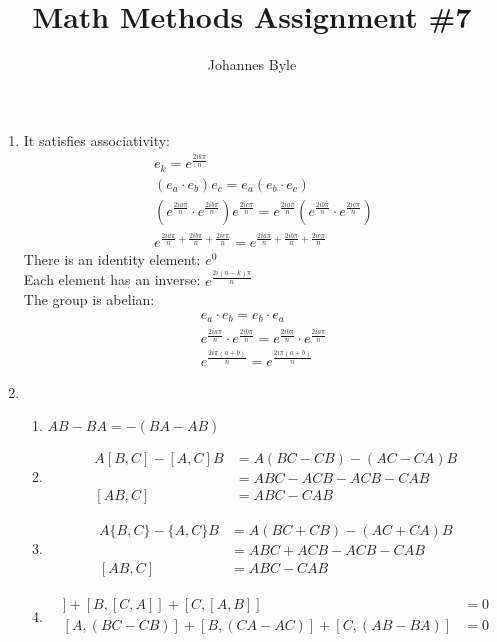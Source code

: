 \documentclass[11pt]{article}
\title{Math Methods Assignment \#7}
\author{Johannes Byle}
\begin{document}
  \maketitle
  \begin{enumerate}
    \item
    It satisfies associativity:
    \begin{gather*}
      e_k=e^{\frac{2ik\pi}{n}}\\
      (e_a\cdot e_b)e_c=e_a(e_b\cdot e_c)\\
      (e^{\frac{2ia\pi}{n}}\cdot e^{\frac{2ib\pi}{n}})e^{\frac{2ic\pi}{n}}=e^{\frac{2ia\pi}{n}}(e^{\frac{2ib\pi}{n}}\cdot e^{\frac{2ic\pi}{n}})\\
      e^{\frac{2ia\pi}{n}+\frac{2ib\pi}{n}+\frac{2ic\pi}{n}}=e^{\frac{2ia\pi}{n}+\frac{2ib\pi}{n}+\frac{2ic\pi}{n}}
    \end{gather*}
    There is an identity element: $e^{0}$\\
    Each element has an inverse: $e^{\frac{2i(n-k)\pi}{n}}$\\
    The group is abelian:
    \begin{gather*}
      e_a\cdot e_b=e_b\cdot e_a\\
      e^{\frac{2ia\pi}{n}}\cdot e^{\frac{2ib\pi}{n}}=e^{\frac{2ib\pi}{n}}\cdot e^{\frac{2ia\pi}{n}}\\
      e^{\frac{2i\pi(a+b)}{n}}=e^{\frac{2i\pi(a+b)}{n}}
    \end{gather*}
    \item
    \begin{enumerate}
      \item $AB-BA=-(BA-AB)$
      \item
      \begin{align*}
        A[B,C]-[A,C]B&=A(BC-CB)-(AC-CA)B\\
        &=ABC-ACB-ACB-CAB\\
        [AB,C]&=ABC-CAB
      \end{align*}
      \item
      \begin{align*}
        A\{B,C\}-\{A,C\}B&=A(BC+CB)-(AC+CA)B\\
        &=ABC+ACB-ACB-CAB\\
        [AB,C]&=ABC-CAB
      \end{align*}
      \item
      \begin{align*}
        [A,[B,C]]+[B,[C,A]]+[C,[A,B]]&=0\\
        [A,(BC-CB)]+[B,(CA-AC)]+[C,(AB-BA)]&=0\\

\end{align*}
\end{enumerate}
\end{enumerate}
\end{document}
